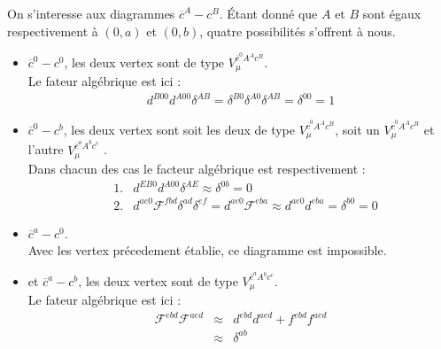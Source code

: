 \documentclass[a4paper,11pt]{article} %
\theoremstyle{plain}
\theoremstyle{definition}
\theoremstyle{remark}
\numberwithin{equation}{section}
\numberwithin{equation}{subsection}
\numberwithin{figure}{section}
\begin{document}
\noindent
On s'interesse aux diagrammes $\overline{c}^{A}  -  c^{B}$. Étant donné que $A$ et $B$ sont égaux respectivement à $(0,a)$ et $(0,b)$, quatre possibilités s'offrent à nous.
 \begin{itemize}
 \item $\overline{c}^{0}  -  c^{0}$, les deux vertex sont de type  $V_{\mu}^{ \overline{c}^{0} A^{A} c^{B} }$. \\
Le fateur algébrique est ici :
\begin{eqnarray*}
 d^{B00} d^{A00} \delta^{AB} = \delta^{B0}  \delta^{A0}  \delta^{AB} =  \delta^{00}  =  1
\end{eqnarray*}

 \item $\overline{c}^{0}  -  c^{b}$, les deux vertex sont soit les deux de type $V_{\mu}^{ \overline{c}^{0} A^{A} c^{B} }$, soit un $V_{\mu}^{ \overline{c}^{0} A^{A} c^{B} }$ et l'autre $V_{\mu}^{ \overline{c}^{a} A^{b} c^{c} }$ . \\ 
Dans chacun des cas le facteur algébrique est respectivement :
\begin{eqnarray*}
 &1.&  d^{EB0} d^{A00} \delta^{AE} \approx \delta^{0b}  = 0  \\
 &2.&  d^{ae0} \mathcal{F}^{fbd} \delta^{ad} \delta^{ef} = d^{ae0} \mathcal{F}^{eba}  \approx d^{ae0} d^{eba} = \delta^{b0}  =  0
\end{eqnarray*}


 \item $\overline{c}^{a}  -  c^{0}$. \\
Avec les vertex précedement établie, ce diagramme est impossible.

 \item et $\overline{c}^{a}  -  c^{b}$, les deux vertex sont de type  $V_{\mu}^{ \overline{c}^{a} A^{b} c^{c} }$. \\
Le fateur algébrique est ici :
\begin{eqnarray*}
 \mathcal{F}^{ebd} \mathcal{F}^{aed} &\approx& d^{ebd} d^{aed} + f^{ebd} f^{aed} \\
                                                                   &\approx& \delta^{ab}
\end{eqnarray*}

\end{itemize} 
\end{document}
